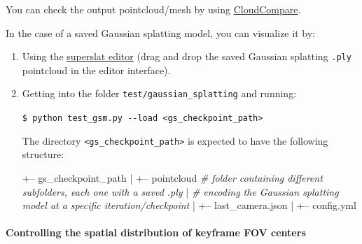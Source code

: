 \documentclass{article}
\newenvironment{Shaded}{\begin{snugshade}}{\end{snugshade}}
\newcommand{\BuiltInTok}[1]{\textcolor[rgb]{0.74,0.68,0.62}{#1}}
\newcommand{\ExtensionTok}[1]{\textcolor[rgb]{0.74,0.68,0.62}{#1}}
\newcommand{\NormalTok}[1]{\textcolor[rgb]{0.74,0.68,0.62}{#1}}
\let\oldparagraph\paragraph
\renewcommand{\paragraph}[1]{\oldparagraph{#1}\mbox{}}
\newcommand{\codeline}[1]{\texttt{\NormalTok{\$ }\BuiltInTok{\ExtensionTok{#1}}}}
\newenvironment{codeblock}
{
\begin{scriptsize}
\begin{Shaded}
}
{
\end{Shaded}
\end{scriptsize}
}
\begin{document}
You can check the output pointcloud/mesh by using
\href{https://www.cloudcompare.org/}{CloudCompare}.

In the case of a saved Gaussian splatting model, you can visualize it
by: 
\begin{enumerate}
\item Using the
\href{https://playcanvas.com/supersplat/editor}{superslat editor} (drag
and drop the saved Gaussian splatting \texttt{.ply} pointcloud in the
editor interface). 

\item Getting into the folder
\texttt{test/gaussian\_splatting} and running:\\
\begin{codeblock}
\codeline{python\ test\_gsm.py\ -\/-load\ \textless{}gs\_checkpoint\_path\textgreater{}}
\end{codeblock}

The directory \texttt{<gs\_checkpoint\_path>} is expected to have the following structure:\\
\begin{scriptsize}
\begin{Shaded}
\begin{Highlighting}[]
\NormalTok{+-- gs_checkpoint_path}
\NormalTok{|   +-- pointcloud         \textit{# folder containing different subfolders, each one with a saved .ply}}
\NormalTok{|                          \textit{# encoding the Gaussian splatting model at a specific iteration/checkpoint}}
\NormalTok{|   +-- last_camera.json}
\NormalTok{|   +-- config.yml}
\end{Highlighting}
\end{Shaded}
\end{scriptsize}

\end{enumerate}



\hypertarget{controlling-the-spatial-distribution-of-keyframe-fov-centers}{%
\paragraph{Controlling the spatial distribution of keyframe FOV
centers}\label{controlling-the-spatial-distribution-of-keyframe-fov-centers}}
\end{document}
